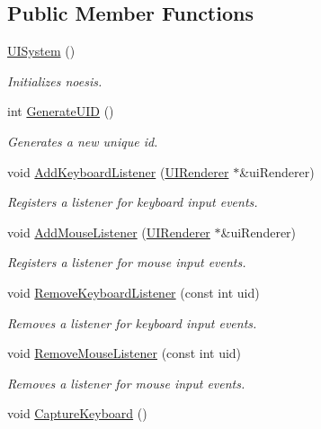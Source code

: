 \subsection*{Public Member Functions}
\begin{DoxyCompactItemize}
\item 
\hypertarget{class_u_i_system_ac930744c42c305f09deacd176045392b}{\hyperlink{class_u_i_system_ac930744c42c305f09deacd176045392b}{U\-I\-System} ()}\label{class_u_i_system_ac930744c42c305f09deacd176045392b}

\begin{DoxyCompactList}\small\item\em Initializes noesis. \end{DoxyCompactList}\item 
int \hyperlink{class_u_i_system_a5735f001450f7ecd82a4de76558640c6}{Generate\-U\-I\-D} ()
\begin{DoxyCompactList}\small\item\em Generates a new unique id. \end{DoxyCompactList}\item 
void \hyperlink{class_u_i_system_a45a982a524c4d35a383232984062e21f}{Add\-Keyboard\-Listener} (\hyperlink{class_u_i_renderer}{U\-I\-Renderer} $\ast$\&ui\-Renderer)
\begin{DoxyCompactList}\small\item\em Registers a listener for keyboard input events. \end{DoxyCompactList}\item 
void \hyperlink{class_u_i_system_a51a64e1ed2767a9f57c52195468ea3bf}{Add\-Mouse\-Listener} (\hyperlink{class_u_i_renderer}{U\-I\-Renderer} $\ast$\&ui\-Renderer)
\begin{DoxyCompactList}\small\item\em Registers a listener for mouse input events. \end{DoxyCompactList}\item 
void \hyperlink{class_u_i_system_a01f185ae5eb2dd12607cff3fbaaebad2}{Remove\-Keyboard\-Listener} (const int uid)
\begin{DoxyCompactList}\small\item\em Removes a listener for keyboard input events. \end{DoxyCompactList}\item 
void \hyperlink{class_u_i_system_a833da0ec7454752a7872d82051366aad}{Remove\-Mouse\-Listener} (const int uid)
\begin{DoxyCompactList}\small\item\em Removes a listener for mouse input events. \end{DoxyCompactList}\item 
\hypertarget{class_u_i_system_a2dd00ec5f796185c5d7601ec03c29695}{void \hyperlink{class_u_i_system_a2dd00ec5f796185c5d7601ec03c29695}{Capture\-Keyboard} ()}\label{class_u_i_system_a2dd00ec5f796185c5d7601ec03c29695}


\end{DoxyCompactItemize}
